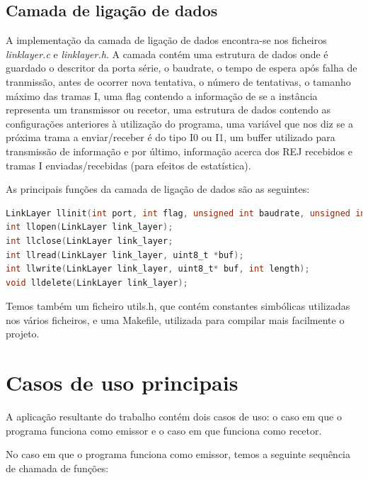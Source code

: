 \documentclass[11pt,a4paper,reqno]{article}
\numberwithin{equation}{section}
\begin{document}
\subsection{Camada de ligação de dados}

A implementação da camada de ligação de dados encontra-se nos ficheiros \textit{linklayer.c} e \textit{linklayer.h}. A camada contém uma estrutura de dados onde é guardado o descritor da porta série, o baudrate, o tempo de espera após falha de tranmissão, antes de ocorrer nova tentativa, o número de tentativas, o tamanho máximo das tramas I, uma flag contendo a informação de se a instância representa um transmissor ou recetor, uma estrutura de dados contendo as configurações anteriores à utilização do programa, uma variável que nos diz se a próxima trama a enviar/receber é do tipo I0 ou I1, um buffer utilizado para transmissão de informação e por último, informação acerca dos REJ recebidos e tramas I enviadas/recebidas (para efeitos de estatística).



As principais funções da camada de ligação de dados são as seguintes:

\begin{lstlisting}[language=C, breaklines=true]
LinkLayer llinit(int port, int flag, unsigned int baudrate, unsigned int max_tries, unsigned int timeout, unsigned int max_frame_size);
int llopen(LinkLayer link_layer);
int llclose(LinkLayer link_layer;
int llread(LinkLayer link_layer, uint8_t *buf);
int llwrite(LinkLayer link_layer, uint8_t* buf, int length);
void lldelete(LinkLayer link_layer);
\end{lstlisting}

Temos também um ficheiro utils.h, que contém constantes simbólicas utilizadas nos vários ficheiros, e uma Makefile, utilizada para compilar mais facilmente o projeto.

\section{Casos de uso principais}

A aplicação resultante do trabalho contém dois casos de uso: o caso em que o programa funciona como emissor e o caso em que funciona como recetor. 

\vspace{5mm}

No caso em que o programa funciona como emissor, temos a seguinte sequência de chamada de funções:
\end{document}
